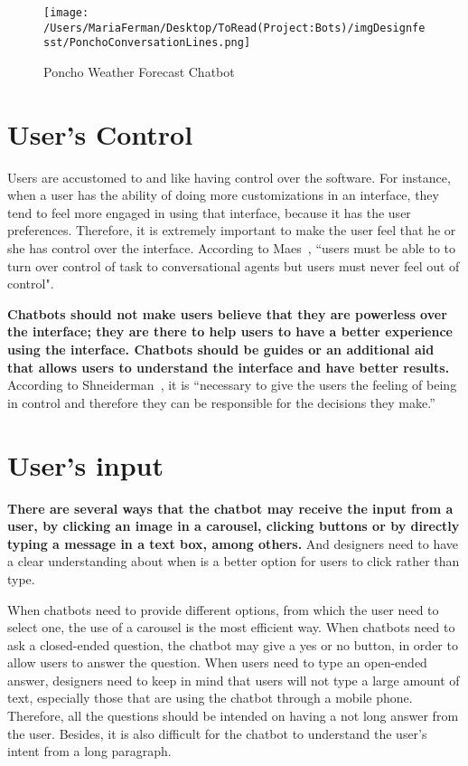 \documentclass[a4paper,10pt]{article}
\begin{document}
\begin{figure}
\centering
\texttt{[image: /Users/MariaFerman/Desktop/ToRead(Project:Bots)/imgDesignfesst/PonchoConversationLines.png]}
\caption{Poncho Weather Forecast Chatbot}
\label{FigurePoncho}
\end{figure}
\section{User's Control}

Users are accustomed to and like having control over the software. For instance, when a user has the ability of doing more customizations in an interface, they tend to feel more engaged in using that interface, because it has the user preferences. Therefore, it is extremely important to make the user feel that he or she has control over the interface. According to Maes~\cite{shneiderman1997direct}, ``users must be able to to turn over control of task to conversational agents but users must never feel out of control".

\textbf{Chatbots should not make users believe that they are powerless over the interface; they are there to help users to have a better experience using the interface. Chatbots should be guides or an additional aid that allows users to understand the interface and have better results.} According to Shneiderman~\cite{shneiderman1997direct}, it is ``necessary to give the users the feeling of being in control and therefore they can be responsible for the decisions they make.” 
\section{User's input}

\textbf{There are several ways that the chatbot may receive the input from a user, by clicking an image in a carousel, clicking buttons or by directly typing a message in a text box, among others.} And designers need to have a clear understanding about when is a better option for users to click rather than type. 

When chatbots need to provide different options, from which the user need to select one, the use of a carousel is the most efficient way. When chatbots need to ask a closed-ended question, the chatbot may give a yes or no button, in order to allow users to answer the question. When users need to type an open-ended answer, designers need to keep in mind that users will not type a large amount of text, especially those that are using the chatbot through a mobile phone. Therefore, all the questions should be intended on having a not long answer from the user. Besides, it is also difficult for the chatbot to understand the user's intent from a long paragraph. 
\end{document}
